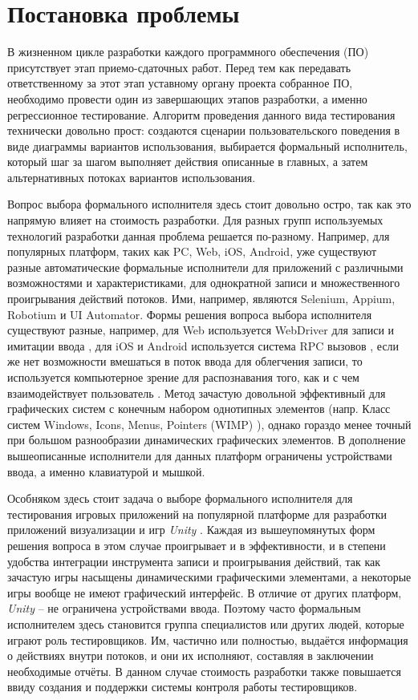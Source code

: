 \Introduction
\section*{Постановка проблемы}
В жизненном цикле разработки каждого программного обеспечения (ПО) присутствует этап приемо-сдаточных работ. Перед тем как передавать ответственному за этот этап уставному органу проекта собранное ПО, необходимо провести один из завершающих этапов разработки, а именно регрессионное тестирование. Алгоритм проведения данного вида тестирования технически довольно прост: создаются сценарии пользовательского поведения в виде диаграммы вариантов использования, выбирается формальный исполнитель, который шаг за шагом выполняет действия описанные в главных, а затем альтернативных потоках вариантов использования.

Вопрос выбора формального исполнителя здесь стоит довольно остро, так как это напрямую влияет на стоимость разработки. Для разных групп используемых технологий разработки данная проблема решается по-разному. Например, для популярных платформ, таких как PC, Web, iOS, Android, уже существуют разные автоматические формальные исполнители для приложений с различными возможностями и характеристиками, для однократной записи и множественного проигрывания действий потоков. Ими, например, являются Selenium, Appium, Robotium и UI Automator. Формы решения вопроса выбора исполнителя существуют разные, например, для Web используется WebDriver для записи и имитации ввода \cite{selenium}, для iOS и Android используется система RPC вызовов \cite{rpc_testing}, если же нет возможности вмешаться в поток ввода для облегчения записи, то используется компьютерное зрение для распознавания того, как и с чем взаимодействует пользователь \cite{appium_opencv}. Метод зачастую довольной эффективный для графических систем с конечным набором однотипных элементов (напр. Класс систем Windows, Icons, Menus, Pointers (WIMP) \cite{wimp}), однако гораздо менее точный при большом разнообразии динамических графических элементов. В дополнение вышеописанные исполнители для данных платформ ограничены устройствами ввода, а именно клавиатурой и мышкой.

Особняком здесь стоит задача о выборе формального исполнителя для тестирования игровых приложений на популярной платформе для разработки приложений визуализации и игр \textit{Unity} \cite{habr}. Каждая из вышеупомянутых форм решения вопроса в этом случае проигрывает и в эффективности, и в степени удобства интеграции инструмента записи и проигрывания действий, так как зачастую игры насыщены динамическими графическими элементами, а некоторые игры вообще не имеют графический интерфейс. В отличие от других платформ, \textit{Unity} -- не ограничена устройствами ввода. Поэтому часто формальным исполнителем здесь становится группа специалистов или других людей, которые играют роль тестировщиков. Им, частично или полностью, выдаётся информация о действиях внутри потоков, и они их исполняют, составляя в заключении необходимые отчёты. В данном случае стоимость разработки также повышается ввиду создания и поддержки системы контроля работы тестировщиков.

